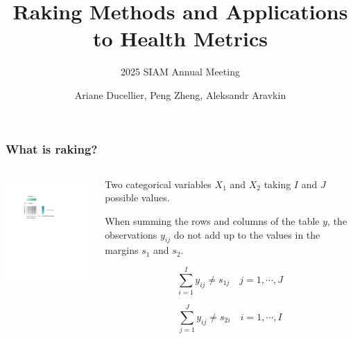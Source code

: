 \documentclass[aspectratio=169]{beamer}
\title{Raking Methods and Applications to Health Metrics}
\subtitle{2025 SIAM Annual Meeting}
\author{Ariane Ducellier, Peng Zheng, Aleksandr Aravkin}
\begin{document}
\begin{frame}
\titlepage
\end{frame}

\begin{frame}
	\frametitle{What is raking?}
	\begin{columns}
	\begin{column}{.5\textwidth}
		\centering
		\includegraphics[width=7cm, trim={4.5cm 18cm 9cm 4.5cm},clip]{raking_2D_before.pdf}
	\end{column}

	\begin{column}{.5\textwidth}
		Two categorical variables $X_1$ and $X_2$ taking $I$ and $J$ possible values.

		\vspace{1em}

		When summing the rows and columns of the table $y$, the observations $y_{ij}$ do not add up to the values in the margins $s_1$ and $s_2$.

		\begin{equation*}
		\sum_{i = 1}^I y_{ij} \neq s_{1j} \quad j = 1 , \cdots , J
		\end{equation*}

		\begin{equation*}
		\sum_{j = 1}^J y_{ij} \neq s_{2i} \quad i = 1 , \cdots , I
		\end{equation*}
	\end{column}
	\end{columns}
\end{frame}
\end{document}
